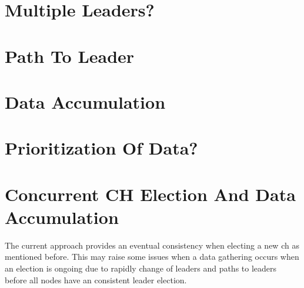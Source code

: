 \documentclass[USenglish]{uit-thesis}
\begin{document}
\section{Multiple Leaders?}


\section{Path To Leader}


\section{Data Accumulation}




\section{Prioritization Of Data?}

\section{Concurrent CH Election And Data Accumulation} \label{disc:simult_el_acc}
The current approach provides an eventual consistency when electing a new \gls{ch} as mentioned before. This may raise some issues when a data gathering occurs when an election is ongoing due to rapidly change of leaders and paths to leaders before all nodes have an consistent leader election.
\end{document}
